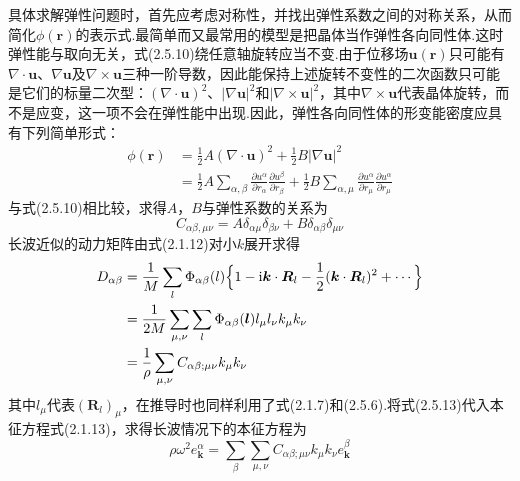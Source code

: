 具体求解弹性问题时，首先应考虑对称性，并找出弹性系数之间的对称关系，从而简化$\phi(\boldsymbol{r})$的表示式.最简单而又最常用的模型是把晶体当作弹性各向同性体.这时弹性能与取向无关，式(2.5.10)绕任意轴旋转应当不变.由于位移场$\boldsymbol{u}(\boldsymbol{r})$只可能有$\nabla\cdot\boldsymbol{u}$、$\nabla\boldsymbol{u}$及$\nabla\times\boldsymbol{u}$三种一阶导数，因此能保持上述旋转不变性的二次函数只可能是它们的标量二次型：$(\nabla\cdot\boldsymbol{u})^2$、$|\nabla\boldsymbol{u}|^2$和$|\nabla\times\boldsymbol{u}|^2$，其中$\nabla\times\boldsymbol{u}$代表晶体旋转，而不是应变，这一项不会在弹性能中出现.因此，弹性各向同性体的形变能密度应具有下列简单形式：
\begin{equation}
\begin{aligned}
  \phi(\boldsymbol{r})&=\frac{1}{2}A(\nabla\cdot\boldsymbol{u})^2
  +\frac{1}{2}B|\nabla\boldsymbol{u}|^2\\
  &=\frac{1}{2}A\sum_{\alpha,\beta}
  \frac{\partial u^{\alpha}}{\partial r_{\alpha}}\frac{\partial u^{\beta}}{\partial r_{\beta}}
  +\frac{1}{2}B\sum_{\alpha,\mu}
  \frac{\partial u^{\alpha}}{\partial r_{\mu}}\frac{\partial u^{\alpha}}{\partial r_{\mu}}
\end{aligned}
\end{equation}
与式(2.5.10)相比较，求得$A$，$B$与弹性系数的关系为
\begin{equation}
  C_{\alpha\beta,\mu\nu}=A\delta_{\alpha\mu}\delta_{\beta\nu}
  +B\delta_{\alpha\beta}\delta_{\mu\nu}
\end{equation}
长波近似的动力矩阵由式(2.1.12)对小$k$展开求得
\begin{equation}
\begin{aligned}
  D_{\alpha\beta}&=\frac{1}{M}\sum_l\Phi_{\alpha\beta}(l)
  \Bigl\{1-\mathrm{i}\boldsymbol{k}\cdot\boldsymbol{R}_l
  -\frac{1}{2}(\boldsymbol{k}\cdot\boldsymbol{R}_l)^2+\cdots\Bigr\}\\
  &=\frac{1}{2M}\sum_{\mu,\nu}\sum_l\Phi_{\alpha\beta}(\boldsymbol{l})
  l_{\mu}l_{\nu}k_{\mu}k_{\nu}\\
  &=\frac{1}{\rho}\sum_{\mu,\nu}C_{\alpha\beta;\mu\nu}k_{\mu}k_{\nu}
\end{aligned}
\end{equation}
其中$l_{\mu}$代表$(\boldsymbol{R}_l)_{\mu}$，在推导时也同样利用了式(2.1.7)和(2.5.6).将式(2.5.13)代入本征方程式(2.1.13)，求得长波情况下的本征方程为
\begin{equation}
  \rho\omega^2e_{\boldsymbol{k}}^{\alpha}
  =\sum_{\beta}\sum_{\mu,\nu}C_{\alpha\beta;\mu\nu}
  k_{\mu}k_{\nu}e_{\boldsymbol{k}}^{\beta}
\end{equation}
